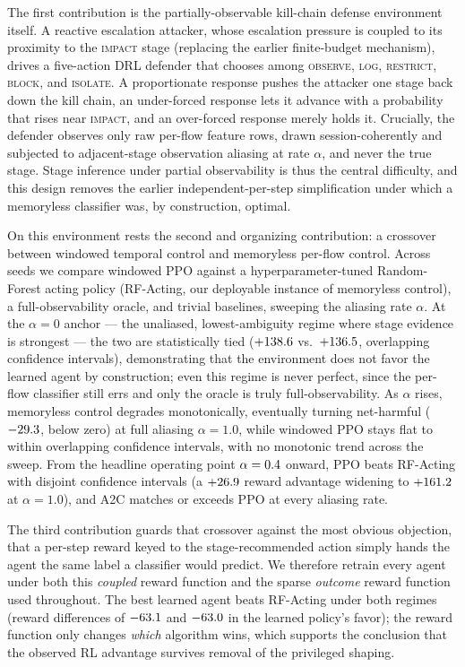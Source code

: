 The first contribution is the partially-observable kill-chain defense environment itself. A reactive escalation attacker, whose escalation pressure is coupled to its proximity to the \textsc{impact} stage (replacing the earlier finite-budget mechanism), drives a five-action DRL defender that chooses among \textsc{observe}, \textsc{log}, \textsc{restrict}, \textsc{block}, and \textsc{isolate}. A proportionate response pushes the attacker one stage back down the kill chain, an under-forced response lets it advance with a probability that rises near \textsc{impact}, and an over-forced response merely holds it. Crucially, the defender observes only raw per-flow feature rows, drawn session-coherently and subjected to adjacent-stage observation aliasing at rate $\alpha$, and never the true stage. Stage inference under partial observability is thus the central difficulty, and this design removes the earlier independent-per-step simplification under which a memoryless classifier was, by construction, optimal.

On this environment rests the second and organizing contribution: a crossover between windowed temporal control and memoryless per-flow control. Across \NumSeeds{} seeds we compare windowed PPO against a hyperparameter-tuned Random-Forest acting policy (RF-Acting, our deployable instance of memoryless control), a full-observability oracle, and trivial baselines, sweeping the aliasing rate $\alpha$. At the $\alpha=0$ anchor --- the unaliased, lowest-ambiguity regime where stage evidence is strongest --- the two are statistically tied ($+138.6$ vs.\ $+136.5$, overlapping confidence intervals), demonstrating that the environment does not favor the learned agent by construction; even this regime is never perfect, since the per-flow classifier still errs and only the oracle is truly full-observability. As $\alpha$ rises, memoryless control degrades monotonically, eventually turning net-harmful ($-29.3$, below zero) at full aliasing $\alpha=1.0$, while windowed PPO stays flat to within overlapping confidence intervals, with no monotonic trend across the sweep. From the headline operating point $\alpha=0.4$ onward, PPO beats RF-Acting with disjoint confidence intervals (a $+26.9$ reward advantage widening to $+161.2$ at $\alpha=1.0$), and A2C matches or exceeds PPO at every aliasing rate.

The third contribution guards that crossover against the most obvious objection, that a per-step reward keyed to the stage-recommended action simply hands the agent the same label a classifier would predict. We therefore retrain every agent under both this \emph{coupled} reward function and the sparse \emph{outcome} reward function used throughout. The best learned agent beats RF-Acting under both regimes (reward differences of $-63.1$ and $-63.0$ in the learned policy's favor); the reward function only changes \emph{which} algorithm wins, which supports the conclusion that the observed RL advantage survives removal of the privileged shaping.

